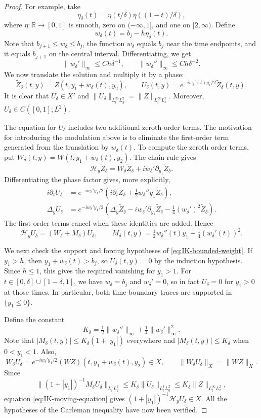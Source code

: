 \documentclass[11pt]{amsart}
\theoremstyle{remark}
\newcommand{\R}{\mathbb R}
\newcommand{\HH}{\mathcal H}
\newcommand{\1}{\mathbf 1}
\begin{document}
\begin{proof}
For example, take
\[
 \eta_\delta(t)=\eta(t/\delta)\eta((1-t)/\delta),
\]
where $\eta:\R\to[0,1]$ is smooth, zero on $(-\infty,1]$, and one on
$[2,\infty)$.  Define
\[
 w_\delta(t)=b_j-h\eta_\delta(t).
\]
Note that $b_{j+1}\le w_\delta\le b_j$, the function $w_\delta$ equals $b_j$
near the time endpoints, and it equals $b_{j+1}$ on the central interval.
Differentiating, we get
\[
 \|w_\delta'\|_\infty\le Ch\delta^{-1},
 \qquad
 \|w_\delta''\|_\infty\le Ch\delta^{-2}.
\]
We now translate the solution and multiply it by a phase:
\[
 \widetilde Z_\delta(t,y)
 =Z(t,y_1+w_\delta(t),y_2),
 \qquad
 U_\delta(t,y)
 =e^{-iw_\delta'(t)y_1/2}\widetilde Z_\delta(t,y).
\]
It is clear that
$U_\delta\in X'$ and
$\|U_\delta\|_{L^\infty_tL^2_y}=\|Z\|_{L^\infty_tL^2_z}$.
Moreover, $U_\delta\in C([0,1];L^2)$. 

The equation for $U_\delta$ includes two additional zeroth-order terms. The motivation for introducing the modulation above is to eliminate the first-order term generated from the translation by $w_{\delta}(t)$. To compute the zeroth order terms, put
$W_\delta(t,y)=W(t,y_1+w_\delta(t),y_2)$.  The chain rule gives
\[
 \HH_y\widetilde Z_\delta
 =W_\delta\widetilde Z_\delta
   +iw_\delta'\partial_{y_1}\widetilde Z_\delta.
\]
Differentiating the phase factor gives, more explicitly,
\begin{align*}
 i\partial_tU_\delta
 &=e^{-iw_\delta'y_1/2}
   \left(i\partial_t\widetilde Z_\delta
         +\tfrac12w_\delta''y_1\widetilde Z_\delta\right),\\
 \Delta_yU_\delta
 &=e^{-iw_\delta'y_1/2}
   \left(\Delta_y\widetilde Z_\delta
         -iw_\delta'\partial_{y_1}\widetilde Z_\delta
         -\tfrac14(w_\delta')^2\widetilde Z_\delta\right).
\end{align*}
The first-order terms cancel when these identities are added.  Hence
\[
 \HH_yU_\delta=(W_\delta+M_\delta)U_\delta,
 \qquad
 M_\delta(t,y)=\tfrac12w_\delta''(t)y_1
               -\tfrac14(w_\delta'(t))^2.
 \tag{1.4c}\label{eq:IK-moving-equation}
\]

We next check the support and forcing hypotheses of
\eqref{eq:IK-bounded-weight}.  If $y_1>h$, then
$y_1+w_\delta(t)>b_j$, so $U_\delta(t,y)=0$ by the induction hypothesis.
Since $h\le1$, this gives the required vanishing for $y_1>1$.
For $t\in[0,\delta]\cup[1-\delta,1]$, we have
$w_\delta=b_j$ and $w_\delta'=0$, so in fact $U_\delta=0$ for $y_1>0$
at those times.  In particular, both time-boundary traces are supported
in $\{y_1\le0\}$.

Define the constant
\[
 K_\delta=\tfrac12\|w_\delta''\|_\infty
          +\tfrac14\|w_\delta'\|_\infty^2.
\]
Note that $|M_\delta(t,y)|\le K_\delta(1+|y_1|)$ everywhere and
$|M_\delta(t,y)|\le K_\delta$ when $0<y_1<1$.
Also,
\[
 W_\delta U_\delta
 =e^{-iw_\delta'y_1/2}(WZ)(t,y_1+w_\delta(t),y_2)\in X,
 \qquad
 \|W_\delta U_\delta\|_X=\|WZ\|_X.
\]
Since
\[
 \|(1+|y_1|)^{-1}M_\delta U_\delta\|_{L^1_tL^2_y}
 \le K_\delta\|U_\delta\|_{L^1_tL^2_y}
 \le K_\delta\|Z\|_{L^\infty_tL^2_z},
\]
equation \eqref{eq:IK-moving-equation} gives
$(1+|y_1|)^{-1}\HH_yU_\delta\in X$.
All the hypotheses of the Carleman inequality have now been verified.


\end{proof}
\end{document}
